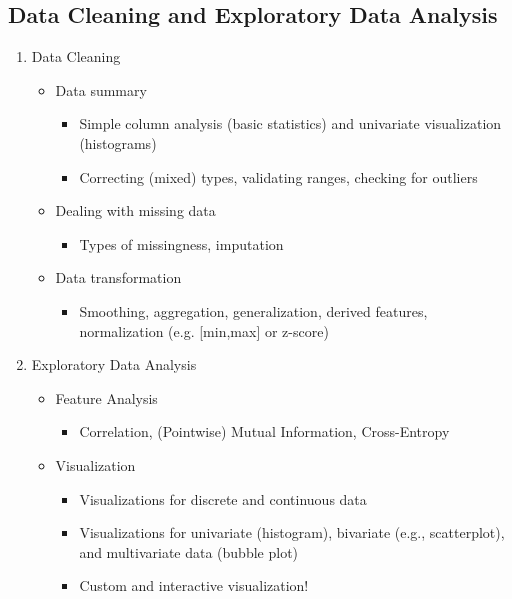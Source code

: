 \documentclass[11pt]{article}
\theoremstyle{definition}
\begin{document}
\subsection{Data Cleaning and Exploratory Data Analysis}
\begin{enumerate}
  \item Data Cleaning
  \begin{itemize}
    \item Data summary
    \begin{itemize}
      \item Simple column analysis (basic statistics) and univariate visualization (histograms)
      \item Correcting (mixed) types, validating ranges, checking for outliers
    \end{itemize}
    \item Dealing with missing data
    \begin{itemize}
      \item Types of missingness, imputation
    \end{itemize}
    \item Data transformation
    \begin{itemize}
      \item Smoothing, aggregation, generalization, derived features, normalization (e.g. [min,max] or z-score)
    \end{itemize}
  \end{itemize}
  \item Exploratory Data Analysis
  \begin{itemize}
    \item Feature Analysis
    \begin{itemize}
      \item Correlation, (Pointwise) Mutual Information, Cross-Entropy
    \end{itemize}
    \item Visualization
    \begin{itemize}
      \item Visualizations for discrete and continuous data
      \item Visualizations for univariate (histogram), bivariate (e.g., scatterplot), and multivariate data (bubble plot)
      \item Custom and interactive visualization!
    \end{itemize}
  \end{itemize}
\end{enumerate}
\end{document}
